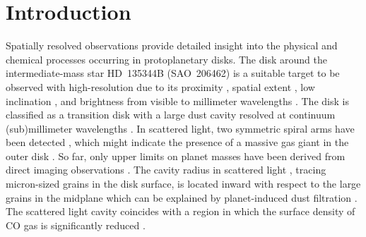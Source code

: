 \documentclass[twocolumn,tighten]{aastex61}
\newcommand{\ffarcs}{\mbox{\ensuremath{.\!\!^{\prime\prime}}}}
\begin{document}

\section{Introduction}

Spatially resolved observations provide detailed insight into the physical and chemical processes occurring in protoplanetary disks. The disk around the intermediate-mass star HD~135344B (SAO~206462) is a suitable target to be observed with high-resolution due to its proximity \citep[$156\pm11$\,pc;][]{gaia2016}, spatial extent \citep[$\sim$1\ffarcs15 in the scattered light;][]{grady2009}, low inclination \citep[$16\degr$;][]{vandermarel2016}, and brightness from visible to millimeter wavelengths \citep[e.g.,][]{carmona2014}. The disk is classified as a transition disk \citep[e.g.,][]{espaillat2014} with a large dust cavity resolved at continuum (sub)millimeter wavelengths \citep[$R_{\rm cav}=51$\,au at 156\,pc;][]{andrews2011}. In scattered light, two symmetric spiral arms have been detected \citep{muto2012}, which might indicate the presence of a massive gas giant in the outer disk \citep{dong2015a,fung2015,dong2017}. So far, only upper limits on planet masses have been derived from direct imaging observations \citep[3\,$M_{\rm Jup}$ at 0\ffarcs7, assuming hot-start evolutionary models;][]{maire2017}. The cavity radius in scattered light \citep[$R_{\rm cav}=27$\,au at 156\,pc;][]{stolker2016}, tracing micron-sized grains in the disk surface, is located inward with respect to the large grains in the midplane which can be explained by planet-induced dust filtration \citep{garufi2013}. The scattered light cavity coincides with a region in which the surface density of CO gas is significantly reduced \citep{vandermarel2016}.
\end{document}
